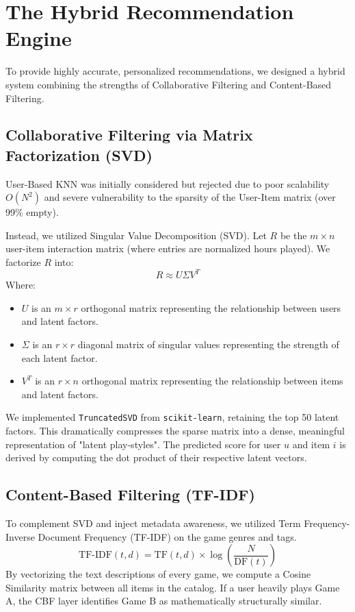 \documentclass[12pt, a4paper]{report}
\begin{document}
\chapter{The Hybrid Recommendation Engine}
To provide highly accurate, personalized recommendations, we designed a hybrid system combining the strengths of Collaborative Filtering and Content-Based Filtering.

\section{Collaborative Filtering via Matrix Factorization (SVD)}
User-Based KNN was initially considered but rejected due to poor scalability $O(N^2)$ and severe vulnerability to the sparsity of the User-Item matrix (over 99\% empty). 

Instead, we utilized Singular Value Decomposition (SVD). Let $R$ be the $m \times n$ user-item interaction matrix (where entries are normalized hours played). We factorize $R$ into:
\[ R \approx U \Sigma V^T \]
Where:
\begin{itemize}
    \item $U$ is an $m \times r$ orthogonal matrix representing the relationship between users and latent factors.
    \item $\Sigma$ is an $r \times r$ diagonal matrix of singular values representing the strength of each latent factor.
    \item $V^T$ is an $r \times n$ orthogonal matrix representing the relationship between items and latent factors.
\end{itemize}
We implemented \texttt{TruncatedSVD} from \texttt{scikit-learn}, retaining the top 50 latent factors. This dramatically compresses the sparse matrix into a dense, meaningful representation of "latent play-styles". The predicted score for user $u$ and item $i$ is derived by computing the dot product of their respective latent vectors.

\section{Content-Based Filtering (TF-IDF)}
To complement SVD and inject metadata awareness, we utilized Term Frequency-Inverse Document Frequency (TF-IDF) on the game genres and tags.
\[ \text{TF-IDF}(t, d) = \text{TF}(t, d) \times \log\left(\frac{N}{\text{DF}(t)}\right) \]
By vectorizing the text descriptions of every game, we compute a Cosine Similarity matrix between all items in the catalog. If a user heavily plays Game A, the CBF layer identifies Game B as mathematically structurally similar.
\end{document}
